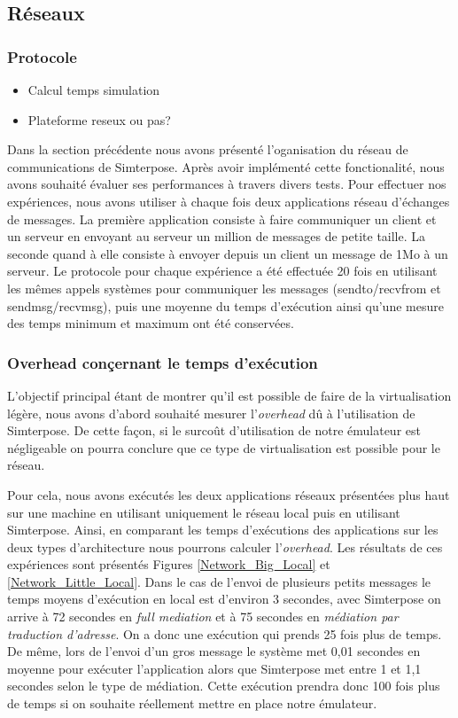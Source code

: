 \subsection{Réseaux}
\label{subsection:res}
\subsubsection{Protocole}
\begin{itemize}
  \item Calcul temps simulation
  \item Plateforme reseux ou pas?
\end{itemize}

Dans la section précédente nous avons présenté l'oganisation du réseau de communications de Simterpose. Après avoir implémenté cette fonctionalité, nous avons souhaité évaluer ses performances à travers divers tests. Pour effectuer nos expériences, nous avons utiliser à chaque fois deux applications réseau d'échanges de messages. La première application consiste à faire communiquer un client et un serveur en envoyant au serveur un million de messages de petite taille. La seconde quand à elle consiste à envoyer depuis un client un message de 1Mo à un serveur. Le protocole pour chaque expérience a été effectuée 20 fois en utilisant les mêmes appels systèmes pour communiquer les messages ({\color{red}sendto/recvfrom et sendmsg/recvmsg}), puis une moyenne du temps d'exécution ainsi qu'une mesure des temps minimum et maximum ont été conservées.

\subsubsection{Overhead conçernant le temps d'exécution}
L'objectif principal étant de montrer qu'il est possible de faire de la virtualisation légère, nous avons d'abord souhaité mesurer l'\textit{overhead} dû à l'utilisation de Simterpose. De cette façon, si le surcoût d'utilisation de notre émulateur est négligeable on pourra conclure que ce type de virtualisation est possible pour le réseau.

Pour cela, nous avons exécutés les deux applications réseaux présentées plus haut sur une machine en utilisant uniquement le réseau local puis en utilisant Simterpose. Ainsi, en comparant les temps d'exécutions des applications sur les deux types d'architecture nous pourrons calculer l'\textit{overhead}. Les résultats de ces expériences sont présentés Figures \ref{Network_Big_Local} et \ref{Network_Little_Local}. Dans le cas de l'envoi de plusieurs petits messages le temps moyens d'exécution en local est d'environ 3 secondes, avec Simterpose on arrive à 72 secondes en \textit{full mediation} et à 75 secondes en \textit{médiation par traduction d'adresse}. On a donc une exécution qui prends 25 fois plus de temps. De même, lors de l'envoi d'un gros message le système met 0,01 secondes en moyenne pour exécuter l'application alors que Simterpose met entre 1 et 1,1 secondes selon le type de médiation. Cette exécution prendra donc 100 fois plus de temps si on souhaite réellement mettre en place notre émulateur.

